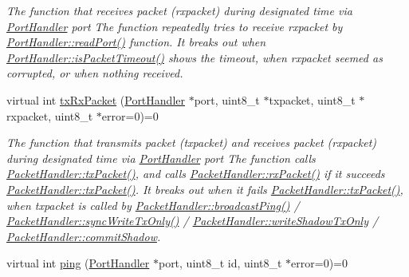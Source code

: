 \begin{DoxyCompactItemize}
\begin{DoxyCompactList}\small\item\em The function that receives packet (rxpacket) during designated time via \hyperlink{classmercury_1_1_port_handler}{Port\+Handler} port  The function repeatedly tries to receive rxpacket by \hyperlink{classmercury_1_1_port_handler_afa6f52d7b95c5ffd8f0c92477d517c79}{Port\+Handler\+::read\+Port()} function.  It breaks out  when \hyperlink{classmercury_1_1_port_handler_a6733438255ede3d34738842e10cd8fc2}{Port\+Handler\+::is\+Packet\+Timeout()} shows the timeout,  when rxpacket seemed as corrupted, or  when nothing received. \end{DoxyCompactList}\item 
virtual int \hyperlink{classmercury_1_1_packet_handler_ac7ceeaec210827d119199144badaad3a}{tx\+Rx\+Packet} (\hyperlink{classmercury_1_1_port_handler}{Port\+Handler} $\ast$port, uint8\+\_\+t $\ast$txpacket, uint8\+\_\+t $\ast$rxpacket, uint8\+\_\+t $\ast$error=0)=0
\begin{DoxyCompactList}\small\item\em The function that transmits packet (txpacket) and receives packet (rxpacket) during designated time via \hyperlink{classmercury_1_1_port_handler}{Port\+Handler} port  The function calls \hyperlink{classmercury_1_1_packet_handler_acc3f84f0d952dc2d827d8500de512abe}{Packet\+Handler\+::tx\+Packet()},  and calls \hyperlink{classmercury_1_1_packet_handler_a01a3929c3514eac14b4ca5a61b498e20}{Packet\+Handler\+::rx\+Packet()} if it succeeds \hyperlink{classmercury_1_1_packet_handler_acc3f84f0d952dc2d827d8500de512abe}{Packet\+Handler\+::tx\+Packet()}.  It breaks out  when it fails \hyperlink{classmercury_1_1_packet_handler_acc3f84f0d952dc2d827d8500de512abe}{Packet\+Handler\+::tx\+Packet()},  when txpacket is called by \hyperlink{classmercury_1_1_packet_handler_aae8b5fb10e57973884589a0318e30fad}{Packet\+Handler\+::broadcast\+Ping()} / \hyperlink{classmercury_1_1_packet_handler_aa4c16ce358c78638f49f6dc1b5b141bd}{Packet\+Handler\+::sync\+Write\+Tx\+Only()} / \hyperlink{classmercury_1_1_packet_handler_a1f0bf77b7d230076624b428664bbf678}{Packet\+Handler\+::write\+Shadow\+Tx\+Only} / \hyperlink{classmercury_1_1_packet_handler_a58972a466fed2dc14463a416af9c9887}{Packet\+Handler\+::commit\+Shadow}. \end{DoxyCompactList}\item 
virtual int \hyperlink{classmercury_1_1_packet_handler_a5fce347ac1f55de301e50bac01c58f4f}{ping} (\hyperlink{classmercury_1_1_port_handler}{Port\+Handler} $\ast$port, uint8\+\_\+t id, uint8\+\_\+t $\ast$error=0)=0

\end{DoxyCompactItemize}
